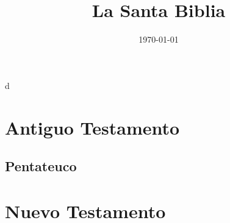 
\newcommand{\titulo}{La Santa Biblia}
\newcommand{\revision}{Reina-Valera 1960}

\title{\titulo}
\date{\today}
\author{}


	\frontmatter
	
	\tableofcontents
d	\mainmatter
	\linespread{2}
	\part*{Antiguo Testamento}
	\startornaments
	\chapter*{Pentateuco}
	
	\flushcolsend
	\flushcolsend
	\flushcolsend
	\flushcolsend
	\stopornaments
	
	\part*{Nuevo Testamento}
	\startornaments
	
	\stopornaments
	


%	
